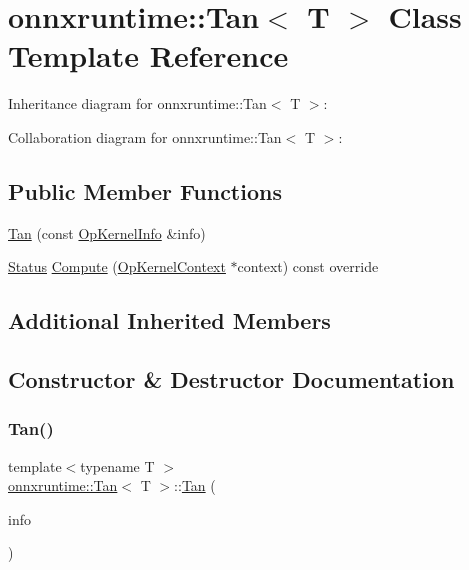 \hypertarget{classonnxruntime_1_1Tan}{}\section{onnxruntime\+:\+:Tan$<$ T $>$ Class Template Reference}
\label{classonnxruntime_1_1Tan}


Inheritance diagram for onnxruntime\+:\+:Tan$<$ T $>$\+:


Collaboration diagram for onnxruntime\+:\+:Tan$<$ T $>$\+:
\subsection*{Public Member Functions}
\begin{DoxyCompactItemize}
\item 
\mbox{\hyperlink{classonnxruntime_1_1Tan_a400e958c4c2efecf2b94a9b9aef9b54c}{Tan}} (const \mbox{\hyperlink{classonnxruntime_1_1OpKernelInfo}{Op\+Kernel\+Info}} \&info)
\item 
\mbox{\hyperlink{classonnxruntime_1_1common_1_1Status}{Status}} \mbox{\hyperlink{classonnxruntime_1_1Tan_ac5313e75705bbdcb234e1cbff21b1c66}{Compute}} (\mbox{\hyperlink{classonnxruntime_1_1OpKernelContext}{Op\+Kernel\+Context}} $\ast$context) const override
\end{DoxyCompactItemize}
\subsection*{Additional Inherited Members}


\subsection{Constructor \& Destructor Documentation}
\mbox{\label{classonnxruntime_1_1Tan_a400e958c4c2efecf2b94a9b9aef9b54c}} 
\subsubsection{\texorpdfstring{Tan()}{Tan()}}
{\footnotesize\ttfamily template$<$typename T $>$ \\
\mbox{\hyperlink{classonnxruntime_1_1Tan}{onnxruntime\+::\+Tan}}$<$ T $>$\+::\mbox{\hyperlink{classonnxruntime_1_1Tan}{Tan}} (\begin{DoxyParamCaption}\item[{const \mbox{\hyperlink{classonnxruntime_1_1OpKernelInfo}{Op\+Kernel\+Info}} \&}]{info }\end{DoxyParamCaption})\hspace{0.3cm}{\ttfamily [inline]}}



